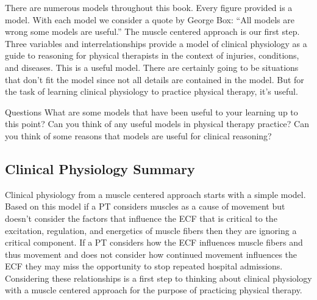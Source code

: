 There are numerous models throughout this book. Every figure provided is a model. With each model we consider a quote by George Box: “All models are wrong some models are useful.” The muscle centered approach is our first step. Three variables and interrelationships provide a model of clinical physiology as a guide to reasoning for physical therapists in the context of injuries, conditions, and diseases. This is a useful model. There are certainly going to be situations that don’t fit the model since not all details are contained in the model. But for the task of learning clinical physiology to practice physical therapy, it's useful. 

\begin{question}{Questions}
    What are some models that have been useful to your learning up to this point? Can you think of any useful models in physical therapy practice? Can you think of some reasons that models are useful for clinical reasoning?
\end{question}


\subsection{Clinical Physiology Summary}

Clinical physiology from a muscle centered approach starts with a simple model. Based on this model if a PT considers muscles as a cause of movement but doesn't consider the factors that influence the ECF that is critical to the excitation, regulation, and energetics\footnotemark{} of muscle fibers then they are ignoring a critical component. If a PT considers how the ECF influences muscle fibers and thus movement and does not consider how continued movement influences the ECF they may miss the opportunity to stop repeated hospital admissions.\footnotemark{} Considering these relationships is a first step to thinking about clinical physiology with a muscle centered approach for the purpose of practicing physical therapy.

